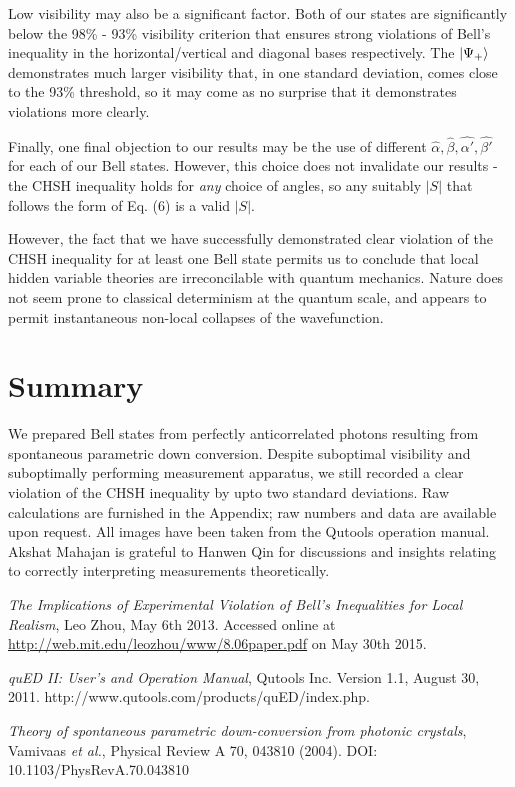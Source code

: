 \documentclass[aps,prl,nofootinbib,twocolumn,superscriptaddress,groupedaddress]{revtex4}  %
\begin{document}
Low visibility may also be a significant factor. Both of our states are significantly below the 98\% - 93\% visibility criterion that ensures strong violations of Bell's inequality in the horizontal/vertical and diagonal bases respectively. The $\ket{\Psi_{+}}$ demonstrates much larger visibility that, in one standard deviation, comes close to the 93\% threshold, so it may come as no surprise that it demonstrates violations more clearly. 

Finally, one final objection to our results may be the use of different $\hat{\alpha},\hat{\beta},\hat{\alpha'},\hat{\beta'}$ for each of our Bell states. However, this choice does not invalidate our results - the CHSH inequality holds for \textit{any} choice of angles, so any suitably $|S|$ that follows the form of Eq. (6) is a valid $|S|$.

However, the fact that we have successfully demonstrated clear violation of the CHSH inequality for at least one Bell state permits us to conclude that local hidden variable theories are irreconcilable with quantum mechanics. Nature does not seem prone to classical determinism at the quantum scale, and appears to permit instantaneous non-local collapses of the wavefunction.
\section{Summary}
We prepared Bell states from perfectly anticorrelated photons resulting from spontaneous parametric down conversion. Despite suboptimal visibility and suboptimally performing measurement apparatus, we still recorded a clear violation of the CHSH inequality by upto two standard deviations. Raw calculations are furnished in the Appendix; raw numbers and data are available upon request. All images have been taken from the Qutools operation manual. Akshat Mahajan is grateful to Hanwen Qin for discussions and insights relating to correctly interpreting measurements theoretically.
\begin{thebibliography}{1}

   \textit{The Implications of Experimental Violation of Bell's Inequalities for Local Realism}, Leo Zhou, May 6th 2013. Accessed online at \url{http://web.mit.edu/leozhou/www/8.06paper.pdf} on May 30th 2015. 

   \textit{quED II: User's and Operation Manual}, Qutools Inc. Version 1.1, August 30, 2011. http://www.qutools.com/products/quED/index.php.
   
   \textit{Theory of spontaneous parametric down-conversion from photonic crystals}, Vamivaas \textit{et al.}, Physical Review A 70, 043810 (2004). DOI: 10.1103/PhysRevA.70.043810
\end{thebibliography}
\end{document}

